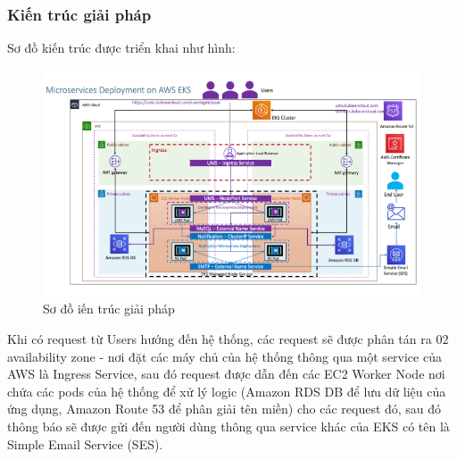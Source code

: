 \subsubsection{Kiến trúc giải pháp}
\noindent Sơ đồ kiến trúc được triển khai như hình:
\begin{figure}[H]
    \begin{center}
    \includegraphics[scale=0.8]{images/hieu/chap-2/solution-architecture.png}
    \vspace*{5mm}
    \caption{Sơ đồ iến trúc giải pháp}
    \end{center}
\end{figure}    
\noindent Khi có request từ Users hướng đến hệ thống, các request sẽ được phân tán ra 02 availability zone - nơi đặt các máy chủ của hệ thống thông qua một service của AWS là Ingress Service, sau đó request được dẫn đến các EC2 Worker Node nơi chứa các pods của hệ thống để xử lý logic (Amazon RDS DB để lưu dữ liệu của ứng dụng, Amazon Route 53 để phân giải tên miền) cho các request đó, sau đó thông báo sẽ được gửi đến người dùng thông qua service khác của EKS có tên là Simple Email Service (SES).